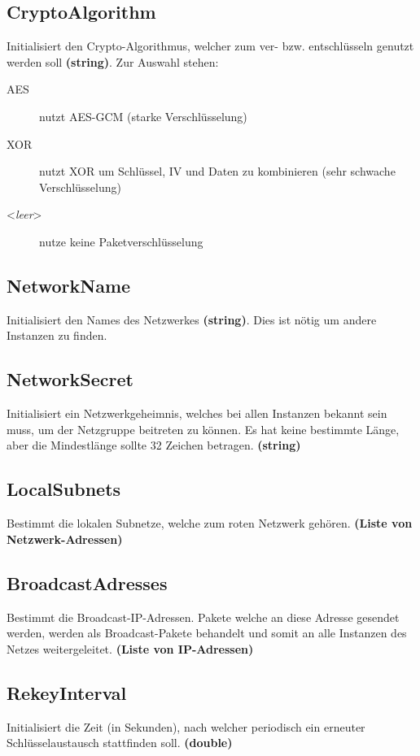 \documentclass[a4paper, 11pt, ngerman, fleqn]{article}
\begin{document}
\subsection{CryptoAlgorithm}
Initialisiert den Crypto-Algorithmus, welcher zum ver- bzw. entschlüsseln genutzt werden soll \textbf{(string)}. Zur Auswahl stehen:
\begin{description}
	\item [AES] nutzt AES-GCM (starke Verschlüsselung)
	\item [XOR] nutzt XOR um Schlüssel, IV und Daten zu kombinieren (sehr schwache Verschlüsselung)
	\item [<\textit{leer}>] nutze keine Paketverschlüsselung
\end{description} 

\subsection{NetworkName}
Initialisiert den Names des Netzwerkes \textbf{(string)}. Dies ist nötig um andere Instanzen zu finden.

\subsection{NetworkSecret}
Initialisiert ein Netzwerkgeheimnis, welches bei allen Instanzen bekannt sein muss, um der Netzgruppe beitreten zu können.
Es hat keine bestimmte Länge, aber die Mindestlänge sollte 32 Zeichen betragen. \textbf{(string)}

\subsection{LocalSubnets}
Bestimmt die lokalen Subnetze, welche zum roten Netzwerk gehören. \textbf{(Liste von Netzwerk-Adressen)}

\subsection{BroadcastAdresses}
Bestimmt die Broadcast-IP-Adressen. Pakete welche an diese Adresse gesendet werden, werden als Broadcast-Pakete behandelt und somit an alle Instanzen des Netzes weitergeleitet. \textbf{(Liste von IP-Adressen)}

\subsection{RekeyInterval}
Initialisiert die Zeit (in Sekunden), nach welcher periodisch ein erneuter Schlüsselaustausch stattfinden soll. \textbf{(double)}
	
\end{document}
